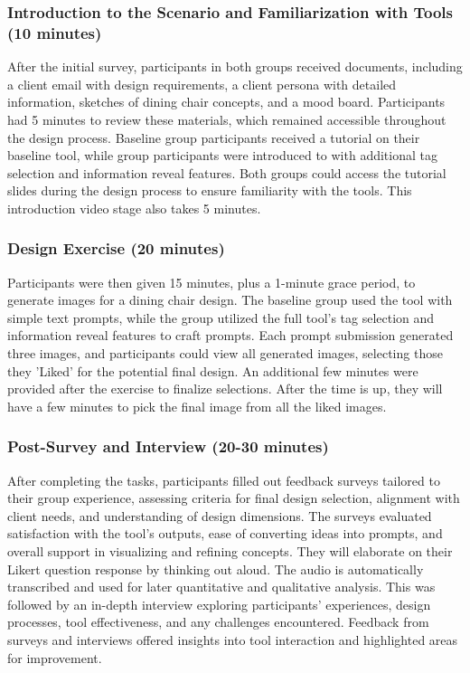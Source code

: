 \subsubsection{Introduction to the Scenario and Familiarization with Tools (10 minutes)}
After the initial survey, participants in both groups received documents, including a client email with design requirements, a client persona with detailed information, sketches of dining chair concepts, and a mood board. Participants had 5 minutes to review these materials, which remained accessible throughout the design process. Baseline group participants received a tutorial on their baseline tool, while \toolname{} group participants were introduced to \toolname{} with additional tag selection and information reveal features. Both groups could access the tutorial slides during the design process to ensure familiarity with the tools. This introduction video stage also takes 5 minutes. 

\subsubsection{Design Exercise (20 minutes)}

Participants were then given 15 minutes, plus a 1-minute grace period, to generate images for a dining chair design. The baseline group used the tool with simple text prompts, while the \toolname{} group utilized the full tool's tag selection and information reveal features to craft prompts. Each prompt submission generated three images, and participants could view all generated images, selecting those they 'Liked' for the potential final design. An additional few minutes were provided after the exercise to finalize selections. After the time is up, they will have a few minutes to pick the final image from all the liked images.

\subsubsection{Post-Survey and Interview (20-30 minutes)}

After completing the tasks, participants filled out feedback surveys tailored to their group experience, assessing criteria for final design selection, alignment with client needs, and understanding of design dimensions. The surveys evaluated satisfaction with the tool's outputs, ease of converting ideas into prompts, and overall support in visualizing and refining concepts. They will elaborate on their Likert question response by thinking out aloud. The audio is automatically transcribed and used for later quantitative and qualitative analysis. This was followed by an in-depth interview exploring participants' experiences, design processes, tool effectiveness, and any challenges encountered. Feedback from surveys and interviews offered insights into tool interaction and highlighted areas for improvement.

